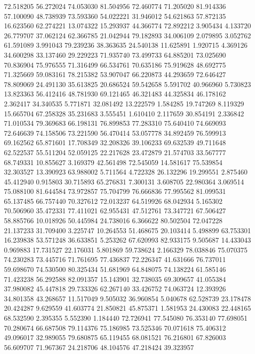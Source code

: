 72.518205
56.272024
74.053030
81.504956
72.460774
71.205020
81.914336
57.100090
48.738939
73.593360
54.022221
31.946012
54.621863
57.872135
16.623560
62.274221
13.074322
15.293937
44.366774
72.892212
3.905434
4.133720
26.779707
37.062124
62.366785
21.042944
79.182893
34.006109
2.079895
3.052762
61.591089
3.991043
79.239236
38.363635
24.540138
11.625891
1.920715
4.369126
34.600298
33.137460
29.229223
71.935740
73.499733
64.885201
73.025690
70.836904
75.976555
71.316499
66.534761
70.635186
75.919628
48.692775
71.325669
59.083161
78.215382
53.907047
66.220873
44.293659
72.646427
78.809069
24.491130
35.613825
20.686524
59.542658
5.591702
40.966960
5.730823
13.823363
56.412416
48.781930
69.121465
46.321483
44.325834
46.178162
2.362417
34.340535
5.771871
32.081492
13.222579
1.584285
19.747269
8.119329
15.665704
67.258328
35.231683
3.555451
1.610410
2.117659
30.854191
2.336842
71.010534
79.369683
66.198131
76.899853
77.283310
75.640410
74.669093
72.646639
74.158506
73.221590
56.470414
53.057778
34.892459
76.599913
69.162562
65.871601
17.708349
32.208326
39.106233
69.632539
49.711648
62.522537
55.511204
52.059125
22.217628
23.472879
21.574703
33.567777
68.749331
10.855627
3.169379
42.561498
72.545059
14.581617
75.539854
32.303527
13.390923
63.988002
5.711564
4.722328
26.132296
19.299551
2.875460
45.412940
0.915803
30.715893
65.276831
7.300131
3.608705
22.980364
3.069514
75.088100
81.644584
73.972857
75.704799
76.666836
77.995562
81.099531
65.137485
66.757440
70.327612
72.013237
64.519926
68.042934
5.165302
70.506960
35.472331
77.411021
62.955431
47.512761
73.347721
67.506427
58.885766
10.018926
50.445984
24.738016
6.366622
80.502504
72.047228
21.137233
31.709400
3.225747
10.264553
51.468675
20.103414
5.498899
63.753301
16.239838
53.571248
36.633851
5.253262
67.620993
82.933175
9.505687
14.433043
0.969883
17.731527
22.176031
5.801869
59.738624
2.166329
78.038846
75.070375
74.230283
73.445716
71.761695
77.436837
72.226347
41.631666
76.737011
59.698670
74.530500
80.325434
51.681969
64.848075
74.138224
61.585146
71.423238
56.292588
82.091357
15.143901
32.738035
69.309657
41.055384
37.980082
45.447818
29.733326
62.267140
33.426752
74.063724
12.393926
34.801358
43.268657
11.517049
9.505032
36.960854
5.040678
62.528739
23.178478
20.424287
9.629559
41.603774
21.850821
45.875371
1.581953
24.430083
22.448165
68.532590
2.395355
5.552390
1.184440
72.726941
77.545080
76.353140
77.698051
70.280674
66.687508
79.114376
75.186985
73.525346
70.071618
75.406312
49.096017
32.989055
79.680875
65.119455
68.081521
76.216801
67.826003
56.609707
71.967367
24.218706
48.104576
47.218424
39.323957
